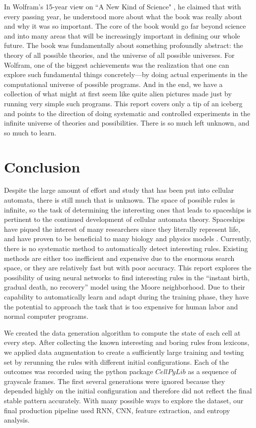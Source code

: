 \documentclass[12pt]{article}
\numberwithin{figure}{section} %
\begin{document}
In Wolfram's 15-year view on “A New Kind of Science" \cite{15 year view}, he claimed that with every passing year, he understood more about what the book was really about and why it was so important. The core of the book would go far beyond science and into many areas that will be increasingly important in defining our whole future. The book was fundamentally about something profoundly abstract: the theory of all possible theories, and the universe of all possible universes. For Wolfram, one of the biggest achievements was the realization that one can explore such fundamental things concretely—by doing actual experiments in the computational universe of possible programs. And in the end, we have a collection of what might at first seem like quite alien pictures made just by running very simple such programs. This report covers only a tip of an iceberg and points to the direction of doing systematic and controlled experiments in the infinite universe of theories and possibilities. There is so much left unknown, and so much to learn. 

\newpage
\section{Conclusion}
Despite the large amount of effort and study that has been put into cellular automata, there is still much that is unknown. The space of possible rules is infinite, so the task of determining the interesting ones that leads to spaceships is pertinent to the continued development of cellular automata theory. Spaceships have piqued the interest of many researchers since they literally represent life, and have proven to be beneficial to many biology and physics models \cite{Cellular automaton}. Currently, there is no systematic method to automatically detect interesting rules. Existing methods are either too inefficient and expensive due to the enormous search space, or they are relatively fast but with poor accuracy. This report explores the possibility of using neural networks to find interesting rules in the “instant birth, gradual death, no recovery” model using the Moore neighborhood. Due to their capability to automatically learn and adapt during the training phase, they have the potential to approach the task that is too expensive for human labor and normal computer programs. 

We created the data generation algorithm to compute the state of each cell at every step. After collecting the known interesting and boring rules from lexicons, we applied data augmentation to create a sufficiently large training and testing set by rerunning the rules with different initial configurations. Each of the outcomes was recorded using the python package $CellPyLib$ as a sequence of grayscale frames. The first several generations were ignored because they depended highly on the initial configuration and therefore did not reflect the final stable pattern accurately. With many possible ways to explore the dataset, our final production pipeline used RNN, CNN, feature extraction, and entropy analysis. 
\end{document}
